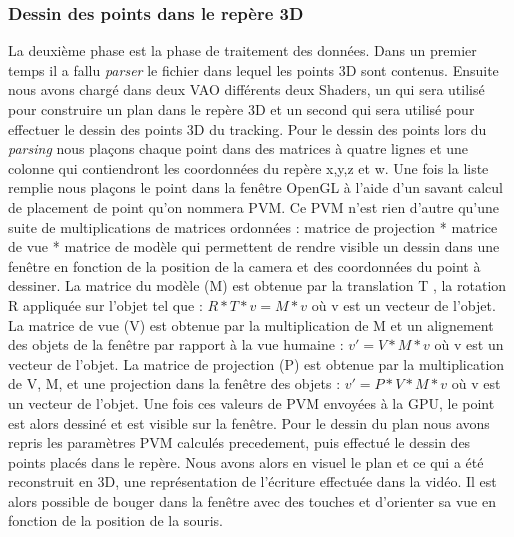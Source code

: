 \subsubsection{Dessin des points dans le repère 3D}
La deuxième phase est la phase de traitement des données. Dans un premier temps il a fallu \textit{parser} le fichier dans lequel les points 3D sont contenus. Ensuite nous avons chargé dans deux VAO différents deux Shaders, un qui sera utilisé pour construire un plan dans le repère 3D et un second qui sera utilisé pour effectuer le dessin des points 3D du tracking. Pour le dessin des points lors du \textit{parsing} nous plaçons chaque point dans des matrices à quatre lignes et une colonne qui contiendront les coordonnées du repère x,y,z et w. Une fois la liste remplie nous plaçons le point dans la fenêtre OpenGL à l'aide d'un savant calcul de placement de point qu'on nommera PVM. Ce PVM n'est rien d'autre qu'une suite de multiplications de matrices ordonnées : matrice de projection * matrice de vue * matrice de modèle qui permettent de rendre visible un dessin dans une fenêtre en fonction de la position de la camera et des coordonnées du point à dessiner.
La matrice du modèle (M) est obtenue par la translation T , la rotation R appliquée sur l'objet tel que : $R * T * v = M * v$ où v est un vecteur de l'objet.
La matrice de vue (V) est obtenue par la multiplication de M et un alignement des objets de la fenêtre par rapport à la vue humaine : $v' = V * M * v$ où v est un vecteur de l'objet.
La matrice de projection (P) est obtenue par la multiplication de V, M, et une projection dans la fenêtre des objets : $v' = P * V * M * v$ où v est un vecteur de l'objet.
Une fois ces valeurs de PVM envoyées à la GPU, le point est alors dessiné et est visible sur la fenêtre.
Pour le dessin du plan nous avons repris les paramètres PVM calculés precedement, puis effectué le dessin des points placés dans le repère.
Nous avons alors en visuel le plan et ce qui a été reconstruit en 3D, une représentation de l'écriture effectuée dans la vidéo. Il est alors possible de bouger dans la fenêtre avec des touches et d'orienter sa vue en fonction de la position de la souris.